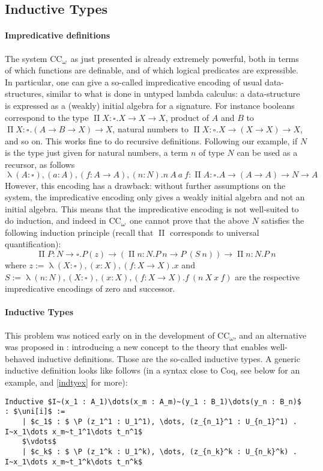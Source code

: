 \documentclass[en]{myarticle}
\newcommand{\uni}[1][]{\square_{#1}}
\renewcommand{\P}{\operatorname{\Pi}}
\DeclareMathOperator{\?}{?}
\renewcommand{\l}{\operatorname{\lambda}}
\newcommand{\coc}{CC\textsubscript{$\omega$}}
\begin{document}
{\subsection{Inductive Types}
\label{induc}

\paragraph{Impredicative definitions}
The system \coc\ as just presented is already extremely powerful, both in terms of which functions are definable, and of which logical predicates are expressible.
In particular, one can give a so-called impredicative encoding of usual data-structures, similar to what is done in untyped lambda calculus: a data-structure is expressed as a (weakly) initial algebra for a signature. For instance booleans correspond to the type $ \P X : \uni. X \to X \to X$, product of $A$ and $B$ to $ \P X : \uni . (A \to B \to X) \to X$, natural numbers to $ \P X : \uni . X \to (X \to X) \to X$, and so on. This works fine to do recursive definitions. Following our example, if $N$ is the type just given for natural numbers, a term $n$ of type $N$ can be used as a recursor, as follows
\[\l (A : \uni), (a : A), (f : A \to A), (n : N) . n~A~a~f :  \P A : \uni . A \to (A \to A) \to N \to A \]
However, this encoding has a drawback: without further assumptions on the system, the impredicative encoding only gives a weakly initial algebra and not an initial algebra. This means that the impredicative encoding is not well-suited to do induction, and indeed in \coc\ one cannot prove that the above $N$ satisfies the following induction principle (recall that $\P$ corresponds to universal quantification):
\[ \P P : N \to \uni. P(z) \to ( \P n : N. P~n \to P~(S~n)) \to  \P n : N. P~n \]
where $z := \l (X : \uni), (x : X), (f : X \to X) . x$ and $S := \l (n : N), (X : \uni), (x : X), (f : X \to X) . f~(n~X~x~f)$ are the respective impredicative encodings of zero and successor.

\paragraph{Inductive Types}
This problem was noticed early on in the development of \coc, and an alternative was proposed in \cite{Paulin-Mohring1993}: introducing a new concept to the theory that enables well-behaved inductive definitions. Those are the so-called inductive types. A generic inductive definition looks like follows (in a syntax close to Coq, see below for an example, and \autoref{indtyex} for more):
\begin{lstlisting}
Inductive $I~(x_1 : A_1)\dots(x_m : A_m)~(y_1 : B_1)\dots(y_n : B_n)$ : $\uni[i]$ :=
	| $c_1$ : $ \P (z_1^1 : U_1^1), \dots, (z_{n_1}^1 : U_{n_1}^1) . I~x_1\dots x_m~t_1^1\dots t_n^1$
	$\vdots$
	| $c_k$ : $ \P (z_1^k : U_1^k), \dots, (z_{n_k}^k : U_{n_k}^k) . I~x_1\dots x_m~t_1^k\dots t_n^k$
\end{lstlisting}

}
\end{document}
